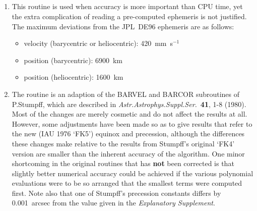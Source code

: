 {
}
{
  \\
}
{
  \\
  \\
  \\
}
\notes
{
 \begin{enumerate}
  \item This routine is used when accuracy is more important
        than CPU time, yet the extra complication of reading a
        pre-computed ephemeris is not justified.  The maximum
        deviations from the JPL~DE96 ephemeris are as follows:
        \begin{itemize}
         \item velocity (barycentric or heliocentric): 420~mm~s$^{-1}$
         \item position (barycentric): 6900~km
         \item position (heliocentric): 1600~km
        \end{itemize}
  \item The routine is an adaption of the BARVEL and BARCOR
        subroutines of P.Stumpff, which are described in
        {\it Astr.Astrophys.Suppl.Ser.}\ {\bf 41}, 1-8 (1980).
        Most of the changes are merely cosmetic and do not affect
        the results at all.  However, some adjustments have been
        made so as to give results that refer to the new (IAU 1976
        `FK5') equinox and precession, although the differences these
        changes make relative to the results from Stumpff's original
        `FK4' version are smaller than the inherent accuracy of the
        algorithm.  One minor shortcoming in the original routines
        that has {\bf not} been corrected is that slightly better
        numerical accuracy could be achieved if the various polynomial
        evaluations were to be so arranged that the smallest terms were
        computed first.  Note also that one of Stumpff's precession
        constants differs by 0.001~arcsec from the value given in the
        {\it Explanatory Supplement}.
 \end{enumerate}
}
